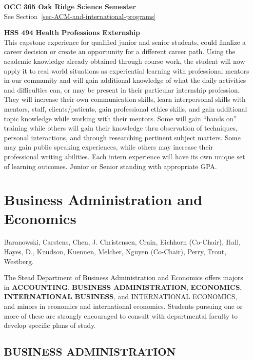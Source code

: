 \documentclass[
  letterpaper,
]{scrbook}
\begin{document}
\textbf{OCC 365 Oak Ridge Science Semester}\\
See Section~\ref{sec-ACM-and-international-programs}

\textbf{HSS 494 Health Professions Externship}\\
This capstone experience for qualified junior and senior students, could
finalize a career decision or create an opportunity for a different
career path. Using the academic knowledge already obtained through
course work, the student will now apply it to real world situations as
experiential learning with professional mentors in our community and
will gain additional knowledge of what the daily activities and
difficulties can, or may be present in their particular internship
profession. They will increase their own communication skills, learn
interpersonal skills with mentors, staff, clients/patients, gain
professional ethics skills, and gain additional topic knowledge while
working with their mentors. Some will gain ``hands on'' training while
others will gain their knowledge thru observation of techniques,
personal interactions, and through researching pertinent subject
matters. Some may gain public speaking experiences, while others may
increase their professional writing abilities. Each intern experience
will have its own unique set of learning outcomes. Junior or Senior
standing with appropriate GPA.

\section{Business Administration and
Economics}\label{sec-business-administration-and-economics}

Baranowski, Carstens, Chen, J. Christensen, Crain, Eichhorn (Co-Chair),
Hall, Hayes, D., Knudson, Kuennen, Melcher, Nguyen (Co-Chair), Perry,
Trout, Westberg.

The Stead Department of Business Administration and Economics offers
majors in \textbf{ACCOUNTING}, \textbf{BUSINESS ADMINISTRATION},
\textbf{ECONOMICS}, \textbf{INTERNATIONAL BUSINESS}, and INTERNATIONAL
ECONOMICS, and minors in economics and international economics. Students
pursuing one or more of these are strongly encouraged to consult with
departmental faculty to develop specific plans of study.

\subsection{BUSINESS ADMINISTRATION}\label{business-administration}
\end{document}

